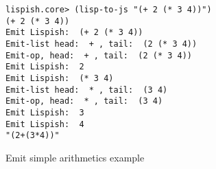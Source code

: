 \begin{figure}[ht]
\begin{verbatim}
lispish.core> (lisp-to-js "(+ 2 (* 3 4))")
(+ 2 (* 3 4))
Emit Lispish:  (+ 2 (* 3 4))
Emit-list head:  + , tail:  (2 (* 3 4))
Emit-op, head:  + , tail:  (2 (* 3 4))
Emit Lispish:  2
Emit Lispish:  (* 3 4)
Emit-list head:  * , tail:  (3 4)
Emit-op, head:  * , tail:  (3 4)
Emit Lispish:  3
Emit Lispish:  4
"(2+(3*4))"
\end{verbatim}
\caption{Emit simple arithmetics example}
\label{fig:emit-simple-arithmetic}
\end{figure}
